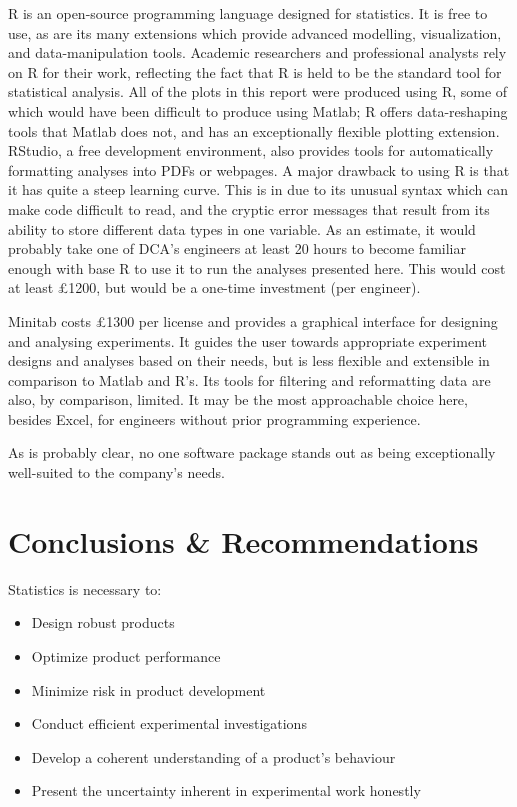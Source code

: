 \documentclass[11pt,a4paper,article]{memoir} %
\begin{document}
R is an open-source programming language designed for statistics. It is free to use, as are its many extensions which provide advanced modelling, visualization, and data-manipulation tools. Academic researchers and professional analysts rely on R for their work, reflecting the fact that R is held to be the standard tool for statistical analysis. All of the plots in this report were produced using R, some of which would have been difficult to produce using Matlab; R offers data-reshaping tools that Matlab does not, and has an exceptionally flexible plotting extension. RStudio, a free development environment, also provides tools for automatically formatting analyses into PDFs or webpages. A major drawback to using R is that it has quite a steep learning curve. This is in due to its unusual syntax which can make code difficult to read, and the cryptic error messages that result from its ability to store different data types in one variable. As an estimate, it would probably take one of DCA's engineers at least 20 hours to become familiar enough with base R to use it to run the analyses presented here. This would cost at least £1200, but would be a one-time investment (per engineer). 
\par
Minitab costs £1300 per license and provides a graphical interface for designing and analysing experiments. It guides the user towards appropriate experiment designs and analyses based on their needs, but is less flexible and extensible in comparison to Matlab and R's. Its tools for filtering and reformatting data are also, by comparison, limited. It may be the most approachable choice here, besides Excel, for engineers without prior programming experience.
\par
As is probably clear, no one software package stands out as being exceptionally well-suited to the company's needs.

\chapter{Conclusions \& Recommendations}

Statistics is necessary to:
\begin{itemize}
\item Design robust products
\item Optimize product performance
\item Minimize risk in product development
\item Conduct efficient experimental investigations
\item Develop a coherent understanding of a product's behaviour
\item Present the uncertainty inherent in experimental work honestly
\end{itemize}
\end{document}
